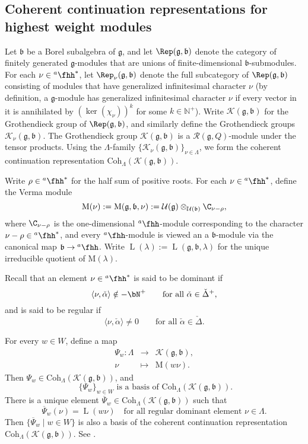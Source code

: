 \documentclass[12pt]{amsart}
\newcommand{\BN}{{\mathbb {N}}}
\newcommand{\CK}{{\mathcal {K}}}
\newcommand{\CU}{{\mathcal {U}}}
\newcommand{\oL}{\operatorname{L}}
\newcommand{\g}{\mathfrak g}
\renewcommand{\b}{\mathfrak b}
\newcommand{\la}{\langle}
\newcommand{\ra}{\rangle}
\newcommand{\be}{\begin {equation}}
\newcommand{\ee}{\end {equation}}
\numberwithin{equation}{section}
\theoremstyle{remark}
\def\hha{{}^a\fhh}
\def\Coh{\mathrm{Coh}}
\begin{document}
\subsection{Coherent continuation representations for highest weight modules}



Let $\b$ be a  Borel subalgebra of $\g$, and let $\Rep(\g,\b)$ denote the category of finitely generated $\g$-modules that are unions of finite-dimensional $\b$-submodules.
For each $\nu\in \hha^*$, let  $\Rep_\nu(\g,\b)$ denote the  full subcategory of $\Rep(\g,\b)$ consisting of modules that have generalized infinitesimal character $\nu$ (by definition, a $\g$-module has generalized infinitesimal character $\nu$ if every vector in it is annihilated by $(\ker(\chi_\nu))^k$ for some $k\in \BN^+$).
Write $\CK(\g,\b)$ for the Grothendieck group of $\Rep(\g,\b)$, and similarly define the Grothendieck groups $\CK_{\nu}(\g,\b)$.
The  Grothendieck group $\CK(\g,\b)$ is a $\mathcal R(\g,Q)$-module under the tensor products. Using the $\Lambda$-family   $\{\CK_\nu(\g,\b)\}_{\nu\in \Lambda}$, we form the coherent continuation representation $\Coh_{\Lambda}( \CK(\g,\b))$.






Write $\rho\in \hha^*$ for the half sum of positive roots.
For each $\nu\in \hha^*$, define the Verma module
\[
  \mathrm M(\nu):=\mathrm M(\g,\b,\nu):=\CU(\g)\otimes_{\CU(\b)} \C_{\nu-\rho},
\]
where  $\C_{\nu-\rho}$ is the one-dimensional $\hha$-module corresponding to the character $\nu-\rho\in \hha^*$, and every $\hha$-module is viewed an a $\b$-module via the canonical map $\b\rightarrow \hha$. Write
$\oL(\lambda):=\oL(\g,\b,\lambda)$ for the unique irreducible quotient of $ \mathrm M(\lambda)$.

Recall that an element $\nu\in \hha^*$ is said to be dominant if
\be\label{dominant}
    \la \nu, \check \alpha\ra\notin -\bN^+ \qquad\textrm{for all $\check \alpha\in \check \Delta^+$},
  \ee
  and is said to be regular if
  \[
    \la \nu, \check \alpha\ra\neq 0 \qquad\textrm{for all $\check \alpha\in \check \Delta$}.
  \]



For every $w\in W$, define a map
\[
\begin{array}{rcl}
  \Psi_{w}: \Lambda&\rightarrow  &\CK(\g,\b), \\
   \nu&\mapsto& \mathrm M(w \nu).
   \end{array}
\]
Then $\Psi_w\in \Coh_{\Lambda}( \CK(\g,\b))$, and
\be\label{basis}
\textrm{ $\{\Psi_w\}_{w\in W}$ is a basis of $\Coh_{\Lambda}( \CK(\g,\b))$. }
\ee
There is a unique element $\overline \Psi_w\in \Coh_{\Lambda}( \CK(\g,\b))$ such that
\be\label{psibarw}
  \overline \Psi_w(\nu)=\oL(w \nu)\quad \textrm{for all regular dominant element $\nu\in \Lambda$}.
\ee
Then $\{\overline \Psi_w\mid w\in W\}$ is also a
basis of the coherent continuation representation $\Coh_{\Lambda}( \CK(\g,\b))$.
See \cite[Section 7.10]{H}.
\end{document}
